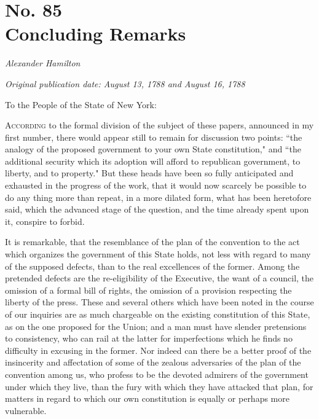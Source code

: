\chapter[No. 85: Concluding Remarks]{No. 85\\ {\small Concluding Remarks}}

\textit{Alexander Hamilton}

\textit{Original publication date: August 13, 1788 and August 16, 1788}
\vspace{1cm}

To the People of the State of New York:
\vspace{.4cm}

\textsc{According} to the formal division of the subject of these papers, announced in my first number, there would appear still to remain for discussion two points: ``the analogy of the proposed government to your own State constitution," and ``the additional security which its adoption will afford to republican government, to liberty, and to property." But these heads have been so fully anticipated and exhausted in the progress of the work, that it would now scarcely be possible to do any thing more than repeat, in a more dilated form, what has been heretofore said, which the advanced stage of the question, and the time already spent upon it, conspire to forbid.

It is remarkable, that the resemblance of the plan of the convention to the act which organizes the government of this State holds, not less with regard to many of the supposed defects, than to the real excellences of the former. 
Among the pretended defects are the re-eligibility of the Executive, the want of a council, the omission of a formal bill of rights, the omission of a provision respecting the liberty of the press. 
These and several others which have been noted in the course of our inquiries are as much chargeable on the existing constitution of this State, as on the one proposed for the Union; and a man must have slender pretensions to consistency, who can rail at the latter for imperfections which he finds no difficulty in excusing in the former. 
Nor indeed can there be a better proof of the insincerity and affectation of some of the zealous adversaries of the plan of the convention among us, who profess to be the devoted admirers of the government under which they live, than the fury with which they have attacked that plan, for matters in regard to which our own constitution is equally or perhaps more vulnerable.

